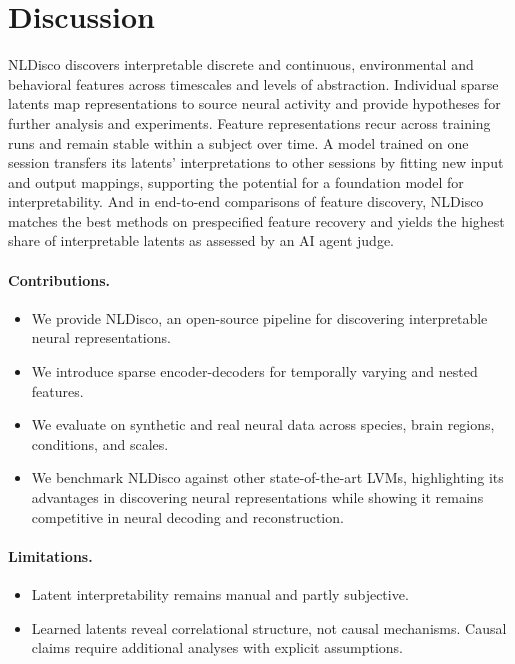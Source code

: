 \section{Discussion}

NLDisco discovers interpretable discrete and continuous, environmental and behavioral features across timescales and levels of abstraction. Individual sparse latents map representations to source neural activity and provide hypotheses for further analysis and experiments. Feature representations recur across training runs and remain stable within a subject over time. A model trained on one session transfers its latents' interpretations to other sessions by fitting new input and output mappings, supporting the potential for a foundation model for interpretability. And in end-to-end comparisons of feature discovery, NLDisco matches the best methods on prespecified feature recovery and yields the highest share of interpretable latents as assessed by an AI agent judge.

\paragraph{Contributions.}
\begin{itemize}[leftmargin=*, nosep, topsep=3pt]
    \item We provide NLDisco, an open-source pipeline for discovering interpretable neural representations.
    \item We introduce sparse encoder-decoders for temporally varying and nested features.
    \item We evaluate on synthetic and real neural data across species, brain regions, conditions, and scales.
    \item We benchmark NLDisco against other state-of-the-art LVMs, highlighting its advantages in discovering neural representations while showing it remains competitive in neural decoding and reconstruction.
\end{itemize}

\paragraph{Limitations.}
\begin{itemize}[leftmargin=*, nosep, topsep=3pt]
    \item Latent interpretability remains manual and partly subjective.
    \item Learned latents reveal correlational structure, not causal mechanisms.  Causal claims require additional analyses with explicit assumptions.
\end{itemize}

